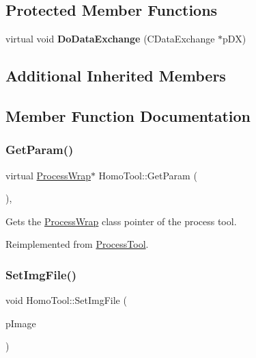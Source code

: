\subsection*{Protected Member Functions}
\begin{DoxyCompactItemize}
\item 
\mbox{\label{class_homo_tool_a023cbc511c52831d2b7144695821f439}} 
virtual void {\bfseries Do\+Data\+Exchange} (C\+Data\+Exchange $\ast$p\+DX)
\end{DoxyCompactItemize}
\subsection*{Additional Inherited Members}


\subsection{Member Function Documentation}
\mbox{\label{class_homo_tool_a497eb4f1812d3f38ea6657c35d64bf31}} 
\subsubsection{\texorpdfstring{Get\+Param()}{GetParam()}}
{\footnotesize\ttfamily virtual \mbox{\hyperlink{class_process_wrap}{Process\+Wrap}}$\ast$ Homo\+Tool\+::\+Get\+Param (\begin{DoxyParamCaption}{ }\end{DoxyParamCaption})\hspace{0.3cm}{\ttfamily [inline]}, {\ttfamily [virtual]}}

Gets the \mbox{\hyperlink{class_process_wrap}{Process\+Wrap}} class pointer of the process tool. 

Reimplemented from \mbox{\hyperlink{class_process_tool_a355ebcf991f86f59f4241ea4345547fc}{Process\+Tool}}.

\mbox{\label{class_homo_tool_af43fe8ae0732dffbeb35b59058509af2}} 
\subsubsection{\texorpdfstring{Set\+Img\+File()}{SetImgFile()}}
{\footnotesize\ttfamily void Homo\+Tool\+::\+Set\+Img\+File (\begin{DoxyParamCaption}\item[{Img\+File $\ast$}]{p\+Image }\end{DoxyParamCaption})\hspace{0.3cm}{\ttfamily [virtual]}}

